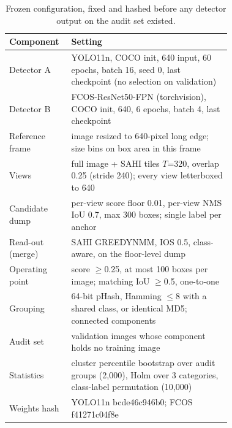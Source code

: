 \begin{table}[!htbp]
\scriptsize
\caption{Frozen configuration, fixed and hashed before any detector output on the audit set existed.}
\label{tab:config}
\begin{tabular}{lp{0.72\linewidth}}
\toprule
Component & Setting \\
\midrule
Detector A & YOLO11n, COCO init, 640 input, 60 epochs, batch 16, seed 0, last checkpoint (no selection on validation) \\
Detector B & FCOS-ResNet50-FPN (torchvision), COCO init, 640, 6 epochs, batch 4, last checkpoint \\
Reference frame & image resized to 640-pixel long edge; size bins on box area in this frame \\
Views & full image + SAHI tiles $T$=320, overlap 0.25 (stride 240); every view letterboxed to 640 \\
Candidate dump & per-view score floor 0.01, per-view NMS IoU 0.7, max 300 boxes; single label per anchor \\
Read-out (merge) & SAHI GREEDYNMM, IOS 0.5, class-aware, on the floor-level dump \\
Operating point & score $\geq$0.25, at most 100 boxes per image; matching IoU $\geq$0.5, one-to-one \\
Grouping & 64-bit pHash, Hamming $\leq$8 with a shared class, or identical MD5; connected components \\
Audit set & validation images whose component holds no training image \\
Statistics & cluster percentile bootstrap over audit groups (2,000), Holm over 3 categories, class-label permutation (10,000) \\
Weights hash & YOLO11n bcde46c946b0; FCOS f41271c04f8e \\
\bottomrule
\end{tabular}
\end{table}
